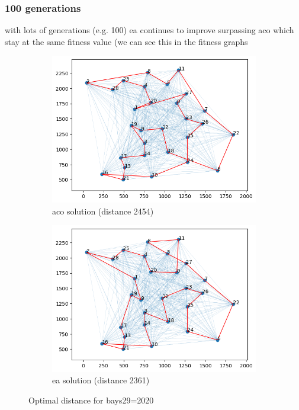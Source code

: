 \subsubsection*{100 generations}
with lots of generations (e.g. 100) ea continues to improve surpassing aco which stay at the same fitness value (we can see this in the fitness graphs
\begin{figure}[H]
    \centering
    \begin{subfigure}[t]{0.5\textwidth}
        \centering
        \includegraphics[width=\linewidth]{images/lab7/tsp_100gen_aco.png}
        \caption{aco solution (distance 2454)}
    \end{subfigure}%
    \begin{subfigure}[t]{0.5\textwidth}
        \centering
        \includegraphics[width=\linewidth]{images/lab7/tsp_100gen_ea.png}
        \caption{ea solution (distance 2361)}
    \end{subfigure}
    \caption{Optimal distance for bays29=2020}
\end{figure}

